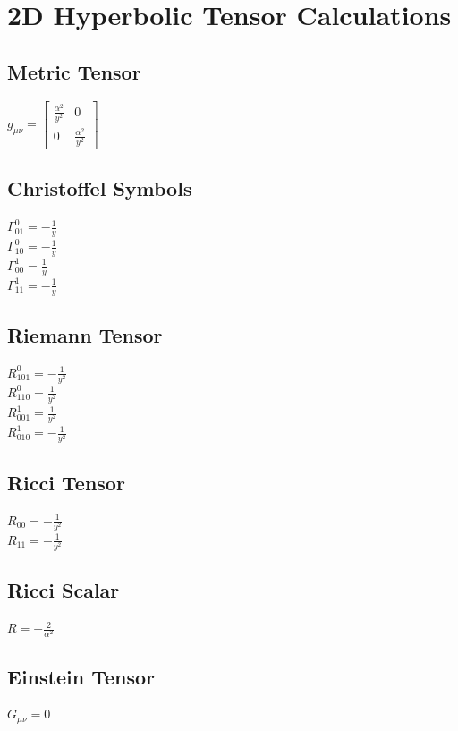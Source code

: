 \documentclass{article}
\begin{document}
\section*{2D Hyperbolic Tensor Calculations}
\subsection*{Metric Tensor}
$g_{\mu\nu} = \left[\begin{matrix}\frac{\alpha^{2}}{y^{2}} & 0\\0 & \frac{\alpha^{2}}{y^{2}}\end{matrix}\right]$

\subsection*{Christoffel Symbols}
$\Gamma^0_{01} = - \frac{1}{y}$\\
$\Gamma^0_{10} = - \frac{1}{y}$\\
$\Gamma^1_{00} = \frac{1}{y}$\\
$\Gamma^1_{11} = - \frac{1}{y}$\\
\subsection*{Riemann Tensor}
$R^0_{101} = - \frac{1}{y^{2}}$\\
$R^0_{110} = \frac{1}{y^{2}}$\\
$R^1_{001} = \frac{1}{y^{2}}$\\
$R^1_{010} = - \frac{1}{y^{2}}$\\
\subsection*{Ricci Tensor}
$R_{00} = - \frac{1}{y^{2}}$\\
$R_{11} = - \frac{1}{y^{2}}$\\
\subsection*{Ricci Scalar}
$R = - \frac{2}{\alpha^{2}}$\\

\subsection*{Einstein Tensor}
$G_{\mu\nu} = 0$\\
\end{document}
